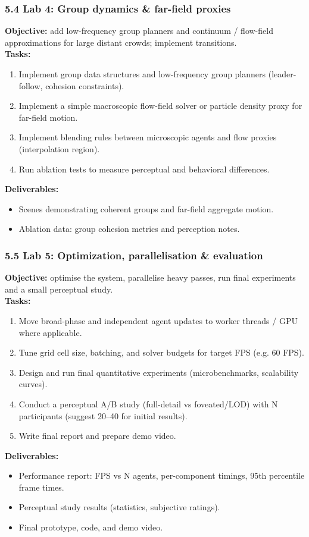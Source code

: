\subsubsection*{5.4 Lab 4: Group dynamics \& far-field proxies}
\textbf{Objective:} add low-frequency group planners and continuum / flow-field approximations for large distant crowds; implement transitions.\\
\textbf{Tasks:}
\begin{enumerate}[itemsep=0pt]
  \item Implement group data structures and low-frequency group planners (leader-follow, cohesion constraints).
  \item Implement a simple macroscopic flow-field solver or particle density proxy for far-field motion.
  \item Implement blending rules between microscopic agents and flow proxies (interpolation region).
  \item Run ablation tests to measure perceptual and behavioral differences.
\end{enumerate}
\textbf{Deliverables:}
\begin{itemize}[itemsep=0pt]
  \item Scenes demonstrating coherent groups and far-field aggregate motion.
  \item Ablation data: group cohesion metrics and perception notes.
\end{itemize}

\subsubsection*{5.5 Lab 5: Optimization, parallelisation \& evaluation}
\textbf{Objective:} optimise the system, parallelise heavy passes, run final experiments and a small perceptual study.\\
\textbf{Tasks:}
\begin{enumerate}[itemsep=0pt]
  \item Move broad-phase and independent agent updates to worker threads / GPU where applicable.
  \item Tune grid cell size, batching, and solver budgets for target FPS (e.g. 60 FPS).
  \item Design and run final quantitative experiments (microbenchmarks, scalability curves).
  \item Conduct a perceptual A/B study (full-detail vs foveated/LOD) with N participants (suggest 20--40 for initial results).
  \item Write final report and prepare demo video.
\end{enumerate}
\textbf{Deliverables:}
\begin{itemize}[itemsep=0pt]
  \item Performance report: FPS vs N agents, per-component timings, 95th percentile frame times.
  \item Perceptual study results (statistics, subjective ratings).
  \item Final prototype, code, and demo video.
\end{itemize}